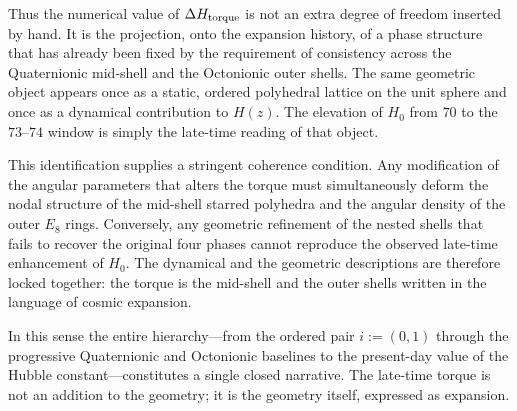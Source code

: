 Thus the numerical value of \(\Delta H_{\rm torque}\) is not an extra degree of freedom inserted by hand. It is the projection, onto the expansion history, of a phase structure that has already been fixed by the requirement of consistency across the Quaternionic mid-shell and the Octonionic outer shells. The same geometric object appears once as a static, ordered polyhedral lattice on the unit sphere and once as a dynamical contribution to \(H(z)\). The elevation of \(H_0\) from \(70\) to the \(73\)–\(74\) window is simply the late-time reading of that object.

This identification supplies a stringent coherence condition. Any modification of the angular parameters that alters the torque must simultaneously deform the nodal structure of the mid-shell starred polyhedra and the angular density of the outer \(E_8\) rings. Conversely, any geometric refinement of the nested shells that fails to recover the original four phases cannot reproduce the observed late-time enhancement of \(H_0\). The dynamical and the geometric descriptions are therefore locked together: the torque is the mid-shell and the outer shells written in the language of cosmic expansion.

In this sense the entire hierarchy—from the ordered pair \(i:=(0,1)\) through the progressive Quaternionic and Octonionic baselines to the present-day value of the Hubble constant—constitutes a single closed narrative. The late-time torque is not an addition to the geometry; it is the geometry itself, expressed as expansion.
